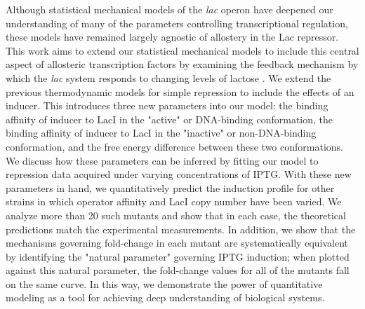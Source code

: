 Although statistical mechanical models of the \textit{lac} operon have deepened our understanding of many of the parameters controlling transcriptional regulation, these models have remained largely agnostic of allostery in the Lac repressor. This work aims to extend our statistical mechanical models to include this central aspect of
allosteric transcription factors by examining the feedback mechanism by which the \textit{lac}
system responds to changing levels of lactose \cite{JACOB1961}. We extend the previous thermodynamic models for simple repression
to include the effects of an inducer. This introduces three new parameters into
our model: the binding affinity of inducer to LacI in the
"active" or DNA-binding conformation, the binding affinity of inducer to LacI in the "inactive" or non-DNA-binding conformation, and the free energy difference between these two conformations. We discuss how these parameters can be inferred by fitting our model to repression data acquired under varying concentrations of IPTG. With these new parameters in hand, we quantitatively predict the induction profile for other strains in which operator affinity and LacI copy number have been varied. We analyze more than 20 such mutants and show that in each case, the theoretical predictions match
the experimental measurements. In addition, we show that the mechanisms governing fold-change in each mutant are systematically equivalent by identifying the "natural parameter" governing IPTG induction; when plotted against this natural parameter, the fold-change values for all of the mutants fall on the same curve. In this way, we demonstrate the power of quantitative modeling as a tool for achieving deep understanding of biological systems. 

